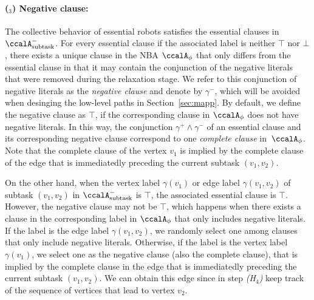 \documentclass[Afour,sageh,times]{sagej}
\newcounter{mycounter}
\newcommand{\auto}[1]{\ccalA_{\textup{#1}}}
\newcommand{\autop}{\ccalA_{\phi}}
\begin{document}
{{   \paragraph{($_3$) Negative clause:} The collective behavior of essential robots satisfies the essential clauses in $\auto{subtask}^-$. For every essential clause if the associated label is neither $\top$ nor $\bot$, there exists a unique clause in the NBA $\autop$ that only differs from the essential clause in that it may contain the conjunction of the negative literals that were removed during the relaxation stage. We refer to this conjunction of negative literals  as the {\it negative clause} and denote by $\gamma^-$, which will be avoided when desinging the low-level paths in Section~\ref{sec:mapp}. By default, we  define the negative clause as $\top$, if the corresponding clause in $\autop$ does not have negative literals. In this way, the conjunction $\gamma^+ \wedge \gamma^-$ of an essential  clause and its corresponding negative clause correspond to  one {\it complete clause} in~$\autop$. Note that the complete clause of the vertex $v_1$ is implied by the complete clause of the edge that is immediatedly preceding the current subtask $(v_1, v_2)$.

   On the other hand, when the vertex label $\gamma(v_1)$ or edge label $\gamma(v_1, v_2)$ of subtask $(v_1, v_2)$ in $\auto{subtask}^-$ is $\top$, the associated essential clause is $\top$. However, the negative clause may not be $\top$, which happens when there exists a  clause in the corresponding label in $\autop$ that only includes negative literals. If the label is the edge label $\gamma(v_1, v_2)$, we randomly select one among clauses that only include negative literals. Otherwise,  if the label is the vertex label $\gamma(v_1)$, we select one as the negative clause (also the complete clause), that is  implied by the complete clause in the edge that is immediatedly preceding the current subtask $(v_1, v_2)$. We can obtain this edge since in step {\it (H$_4$)} keep track of the sequence of vertices that lead to vertex $v_2$.}

}
\end{document}
